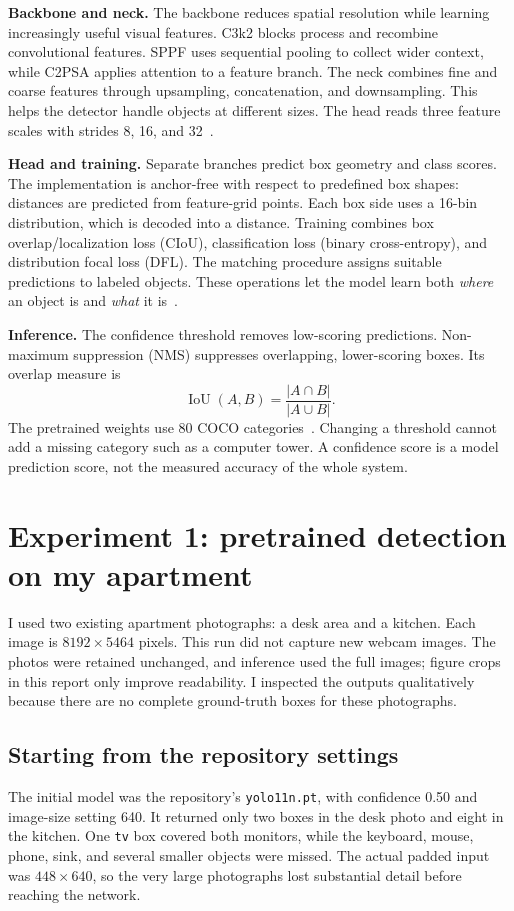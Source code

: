 \documentclass[10pt,letterpaper]{article}
\begin{document}
\textbf{Backbone and neck.} The backbone reduces spatial resolution while learning increasingly useful visual features. C3k2 blocks process and recombine convolutional features. SPPF uses sequential pooling to collect wider context, while C2PSA applies attention to a feature branch. The neck combines fine and coarse features through upsampling, concatenation, and downsampling. This helps the detector handle objects at different sizes. The head reads three feature scales with strides 8, 16, and 32~\cite{implementation}.

\textbf{Head and training.} Separate branches predict box geometry and class scores. The implementation is anchor-free with respect to predefined box shapes: distances are predicted from feature-grid points. Each box side uses a 16-bin distribution, which is decoded into a distance. Training combines box overlap/localization loss (CIoU), classification loss (binary cross-entropy), and distribution focal loss (DFL). The matching procedure assigns suitable predictions to labeled objects. These operations let the model learn both \emph{where} an object is and \emph{what} it is~\cite{implementation}.

\textbf{Inference.} The confidence threshold removes low-scoring predictions. Non-maximum suppression (NMS) suppresses overlapping, lower-scoring boxes. Its overlap measure is
\[
\operatorname{IoU}(A,B)=\frac{|A\cap B|}{|A\cup B|}.
\]
The pretrained weights use 80 COCO categories~\cite{yolo11}. Changing a threshold cannot add a missing category such as a computer tower. A confidence score is a model prediction score, not the measured accuracy of the whole system.

\newpage
\section{Experiment 1: pretrained detection on my apartment}
I used two existing apartment photographs: a desk area and a kitchen. Each image is $8192\times5464$ pixels. This run did not capture new webcam images. The photos were retained unchanged, and inference used the full images; figure crops in this report only improve readability. I inspected the outputs qualitatively because there are no complete ground-truth boxes for these photographs.

\subsection{Starting from the repository settings}
The initial model was the repository's \texttt{yolo11n.pt}, with confidence 0.50 and image-size setting 640. It returned only two boxes in the desk photo and eight in the kitchen. One \texttt{tv} box covered both monitors, while the keyboard, mouse, phone, sink, and several smaller objects were missed. The actual padded input was $448\times640$, so the very large photographs lost substantial detail before reaching the network.
\end{document}
